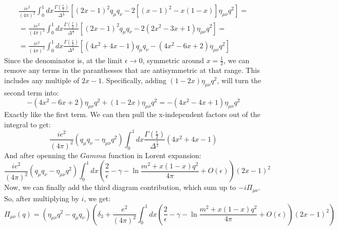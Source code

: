 \documentclass{article}
\begin{document}
\begin{equation}
\begin{gathered}
    \frac{i e^2}{(4\pi)^2} \int_0^1 dx \frac{\Gamma\left(\frac{\epsilon}{2}\right)}{\Delta^{\frac{\epsilon}{2}}} \left[
        (2x - 1)^2q_\mu q_\nu - 2[(x - 1)^2 - x(1 - x)] \eta_{\mu\nu} q^2
    \right] = \\ =
    \frac{i e^2}{(4\pi)^2} \int_0^1 dx \frac{\Gamma\left(\frac{\epsilon}{2}\right)}{\Delta^{\frac{\epsilon}{2}}} \left[
        (2x - 1)^2q_\mu q_\nu - 2(2x^2 - 3x + 1) \eta_{\mu\nu} q^2
    \right] = \\ =
    \frac{i e^2}{(4\pi)^2} \int_0^1 dx \frac{\Gamma\left(\frac{\epsilon}{2}\right)}{\Delta^{\frac{\epsilon}{2}}} \left[
        (4x^2 + 4x - 1)q_\mu q_\nu - (4x^2 - 6x + 2) \eta_{\mu\nu} q^2
    \right]
\end{gathered}
\end{equation}
Since the denominator is, at the limit $\epsilon \rightarrow 0$, symmetric around $x = \frac{1}{2}$, we can remove any terms in the paranthesses that are antisymmetric at that range. This includes any multiple of $2x - 1$. Specifically, adding $(1 - 2x) \eta_{\mu\nu}q^2$, will turn the second term into:
\begin{equation}
    - (4x^2 - 6x + 2) \eta_{\mu\nu} q^2 + (1 - 2x) \eta_{\mu\nu}q^2 = 
    - (4x^2 - 4x + 1) \eta_{\mu\nu}q^2
\end{equation}
Exactly like the first term. We can then pull the x-independent factors out of the integral to get:
\begin{equation}
    \frac{i e^2}{(4\pi)^2} \left(q_\mu q_\nu - \eta_{\mu\nu}q^2\right) \int_0^1 dx \frac{\Gamma\left(\frac{\epsilon}{2}\right)}{\Delta^{\frac{\epsilon}{2}}}(4x^2 + 4x - 1)
\end{equation}
And after openning the $Gamma$ function in Lorent expansion:
\begin{equation}
    \frac{i e^2}{(4\pi)^2} \left(q_\mu q_\nu - \eta_{\mu\nu}q^2\right) \int_0^1 dx \left(\frac{2}{\epsilon} - \gamma - \ln \frac{m^2 + x(1 - x)q^2}{4\pi} + O(\epsilon)\right)(2x - 1)^2
\end{equation}
Now, we can finally add the third diagram contribution, which sum up to $-i\Pi_{\mu\nu}$. So, after multiplying by $i$, we get:
\begin{equation}
    \Pi_{\mu\nu}(q) = (\eta_{\mu\nu}q^2 - q_{\mu}q_{\nu})\left(
        \delta_3 + \frac{e^2}{(4\pi)^2} \int_0^1 dx \left(\frac{2}{\epsilon} - \gamma - \ln \frac{m^2 + x(1 - x)q^2}{4\pi} + O(\epsilon)\right)(2x - 1)^2
    \right)
\end{equation}
\end{document}
